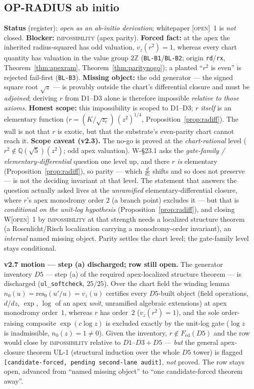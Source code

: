 \documentclass[11pt]{article}
\newcommand{\tagO}{\textcolor{cO}{\textsc{[open]}}}
\newcommand{\hx}[1]{\textcolor{cC}{\footnotesize\texttt{#1}}}
\newcommand{\Q}{\mathbb{Q}}
\newcommand{\Z}{\mathbb{Z}}
\theoremstyle{plain}
\theoremstyle{definition}
\theoremstyle{remark}
\begin{document}
\subsection{OP-RADIUS ab initio}\label{blk:radab}
\textbf{Status} (register): \emph{open as an ab-initio derivation}; whitepaper
\tagO{}~1 is \emph{not} closed. \textbf{Blocker:} \textsc{impossibility} (apex
parity). \textbf{Forced fact:} at the apex the inherited radius-squared has odd
valuation, $v_z(r^2)=1$, whereas every chart quantity has valuation in the value
group $2\Z$ (\hx{BL-B1}/\hx{BL-B2}; origin \texttt{rd}/\texttt{rx},
Theorem~\ref{thm:apexram}, Theorem~\ref{thm:paritynogo}); a planted ``$r^2$ is
even'' is rejected fail-first (\hx{BL-B3}). \textbf{Missing object:} the odd
generator --- the signed square root $\sqrt z$ --- is provably outside the
chart's differential closure and must be \emph{adjoined}; deriving $r$ from
D1--D3 alone is therefore impossible \emph{relative to those axioms}.
\textbf{Honest scope:} this impossibility is scoped to D1--D3; $r$ \emph{itself}
is an elementary function ($r=(K/\sqrt{z_c})\,(z^2)^{1/4}$,
Proposition~\ref{prop:radiff}). The wall is not that $r$ is exotic, but that the
substrate's even-parity chart cannot reach it.
\textbf{Scope caveat (v2.3).} The no-go is proved at the \emph{chart-rational}
level ($r^2\notin\Q(\sqrt5)(z^2)$; odd apex valuation). W-\S23.1 asks the
\emph{gate-family / elementary-differential} question one level up, and there $r$
\emph{is} elementary (Proposition~\ref{prop:radiff}), so parity --- which
$\tfrac{d}{dz}$ shifts and so does not preserve --- is not the deciding invariant
at that level. The statement that answers the question actually asked lives at the
\emph{unramified} elementary-differential closure, where $r$'s apex monodromy
order $2$ (a branch point) excludes it --- but that is \emph{conditional on the
unit-log hypothesis} (Proposition~\ref{prop:radiff}), and closing W\tagO{}~1 by
\textsc{impossibility} at that strength needs a localized structure theorem (a
Rosenlicht/Risch localization carrying a monodromy-order invariant), an
\emph{internal} named missing object. Parity settles the chart level; the
gate-family level stays conditional.

\smallskip\noindent
\textbf{v2.7 motion --- step (a) discharged; row still open.} The generator
inventory $D5$ --- step (a) of the required apex-localized structure theorem --- is
discharged (\texttt{ul\_softcheck}, $25/25$). Over the chart field the winding lemma
$n_0(u)=\mathrm{res}_0(u'/u)=v_z(u)$ certifies every $D5$-built object (field
operations, $d/dz$, $\exp$, $\log$ of an apex \emph{unit}, unramified algebraic
extensions) at apex monodromy order~$1$, whereas $r$ has order~$2$ ($v_z(r^2)=1$),
and the sole order-raising composite $\exp(c\log z)$ is excluded exactly by the
unit-log gate ($\log z$ is inadmissible, $n_0(z)=1\ne0$). Given the inventory,
$r\notin F_{\mathrm{ed}}(D5)$ and the row would close by \textsc{impossibility}
relative to $D1$--$D3+D5$ --- \emph{but} the general apex-closure theorem
\textsc{UL-1} (structural induction over the whole $D5$ tower) is flagged
\texttt{[candidate-forced, pending second-lane audit]}, \emph{not} proved. The row
stays open, advanced from ``named missing object'' to ``one candidate-forced theorem
away''.
\end{document}
